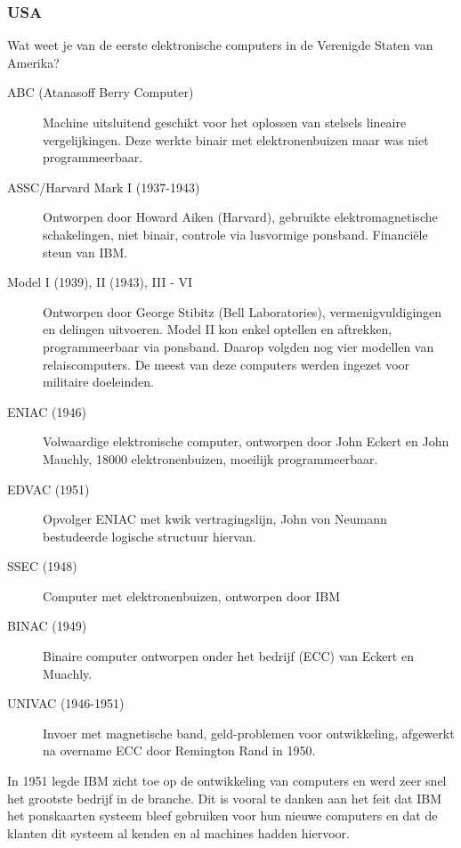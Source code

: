 \documentclass[../main.tex]{subfiles}
\begin{document}
\subsubsection{USA}
\begin{question} Wat weet je van de eerste elektronische computers in de Verenigde Staten van Amerika? \end{question}
\begin{solution}
	\begin{description}
		\item[ABC (Atanasoff Berry Computer)]
		Machine uitsluitend geschikt voor het oplossen van stelsels lineaire vergelijkingen. Deze werkte binair met elektronenbuizen maar was niet programmeerbaar.
		\item[ASSC/Harvard Mark I (1937-1943)]
		Ontworpen door Howard Aiken (Harvard), gebruikte elektromagnetische schakelingen, niet binair, controle via lusvormige ponsband. Financi\"ele steun van IBM.
		\item[Model I (1939), II (1943), III - VI]
		Ontworpen door George Stibitz (Bell Laboratories), vermenigvuldigingen en delingen uitvoeren. Model II kon enkel optellen en aftrekken, programmeerbaar via ponsband. Daarop volgden nog vier modellen van relaiscomputers. De meest van deze computers werden ingezet voor militaire doeleinden.
		\item[ENIAC (1946)]
		Volwaardige elektronische computer, ontworpen door John Eckert en John Mauchly, 18000 elektronenbuizen, moeilijk programmeerbaar.
		\item[EDVAC (1951)]
		Opvolger ENIAC met kwik vertragingslijn, John von Neumann bestudeerde logische structuur hiervan.
		\item[SSEC (1948)]
		Computer met elektronenbuizen, ontworpen door IBM
		\item[BINAC (1949)]
		Binaire computer ontworpen onder het bedrijf (ECC) van Eckert en Muachly.
		\item[UNIVAC (1946-1951)]
		Invoer met magnetische band, geld-problemen voor ontwikkeling, afgewerkt na overname ECC door Remington Rand in 1950.
	\end{description}

	In 1951 legde IBM zicht toe op de ontwikkeling van computers en werd zeer snel het grootste bedrijf in de branche. Dit is vooral te danken aan het feit dat IBM het ponskaarten systeem bleef gebruiken voor hun nieuwe computers en dat de klanten dit systeem al kenden en al machines hadden hiervoor.
\end{solution}
\end{document}
